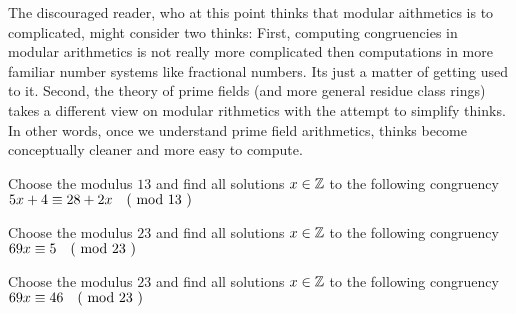 The discouraged reader, who at this point thinks that modular aithmetics is to complicated, might consider two thinks: First, computing congruencies in modular arithmetics is not really more complicated then computations in more familiar number systems like fractional numbers. Its just a matter of getting used to it. Second, the theory of prime fields (and more general residue class rings) takes a different view on modular rithmetics with the attempt to simplify thinks. In other words, once we understand prime field arithmetics, thinks become conceptually cleaner and more easy to compute.
\begin{exercise}Choose the modulus $13$ and find all solutions $x\in \mathbb{Z}$ to the following congruency $5x+4 \equiv 28+2x \quad \text{( mod } 13 \text{ )}$
\end{exercise}
\begin{exercise}Choose the modulus $23$ and find all solutions $x\in \mathbb{Z}$ to the following congruency $69x \equiv 5 \quad \text{( mod } 23 \text{ )}$
\end{exercise}
\begin{exercise}Choose the modulus $23$ and find all solutions $x\in \mathbb{Z}$ to the following congruency $69x \equiv 46 \quad \text{( mod } 23 \text{ )}$
\end{exercise}
